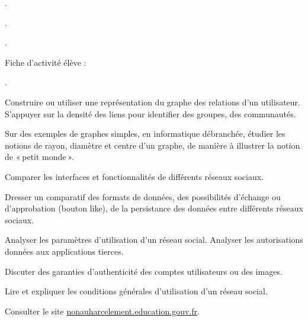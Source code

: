 \begin{jazzitemize}
\item {}.
\item {}.
\item {}.
\end{jazzitemize}

\noindent Fiche d'activité élève :
\begin{jazzitemize}
\item {}.
\end{jazzitemize}


\begin{tcolorbox}[title={Ce que propose le programme}, toprule=0pt, leftrule=0pt, rightrule=0pt, arc=0pt,
                  fonttitle=\scshape\boxtitlefont,
                  colbacktitle=white, coltitle=firstcolor, colframe=firstcolor, colback=firstcolor!10,
                  breakable, enhanced jigsaw]
\begin{jazzitemize}
\item Construire ou utiliser une représentation du graphe des relations d’un utilisateur. S’appuyer sur la densité des liens pour identifier des groupes, des communautés.   
\item Sur des exemples de graphes simples, en informatique débranchée, étudier les notions de rayon, diamètre et centre d’un graphe, de manière à illustrer la notion de « petit monde ». 
\item Comparer les interfaces et fonctionnalités de différents réseaux sociaux.
\item Dresser un comparatif des formats de données, des possibilités d’échange ou d’approbation (bouton like), de la persistance des données entre différents réseaux sociaux.
\item Analyser les paramètres d’utilisation d’un réseau social. Analyser les autorisations données aux applications tierces.
\item Discuter des garanties d’authenticité des comptes utilisateurs ou des images.
\item Lire et expliquer les conditions générales d’utilisation d’un réseau social.
\item Consulter le site \url{nonauharcelement.education.gouv.fr}.
\end{jazzitemize}
\end{tcolorbox}


